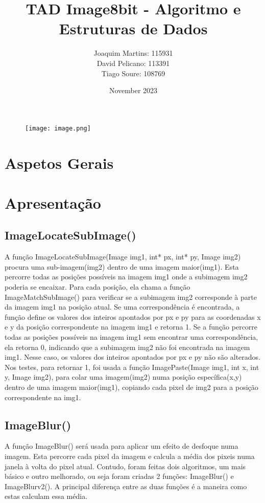 \documentclass{article}
\title{TAD Image8bit - Algoritmo e Estruturas de Dados}
\author{
  Joaquim Martins: 115931 \\
  David Pelicano: 113391 \\
  Tiago Soure: 108769
}
\date{November 2023}
\begin{document}
\maketitle

\begin{figure}[H]
  \centering
  \texttt{[image: image.png]}
\end{figure}  

\newpage
\renewcommand\contentsname{Índice}
\tableofcontents 
\newpage


\section{Aspetos Gerais}

\section{Apresentação}
\subsection{ImageLocateSubImage()}

A função ImageLocateSubImage(Image img1, int* px, int* py, Image img2) procura uma sub-imagem(img2) dentro
de uma imagem maior(img1). Esta percorre todas as posições possíveis na imagem img1 onde a subimagem img2
poderia se encaixar. 
Para cada posição, ela chama a função ImageMatchSubImage() para verificar se a subimagem img2 
corresponde à parte da imagem img1 na posição atual.
Se uma correspondência é encontrada, a função define os valores dos inteiros apontados por px e
py para as coordenadas x e y da posição correspondente na imagem img1 e retorna 1.
Se a função percorre todas as posições possíveis na imagem img1 sem encontrar uma correspondência,
ela retorna 0, indicando que a subimagem img2 não foi encontrada na imagem img1. Nesse caso, os valores
dos inteiros apontados por px e py não são alterados.
Nos testes, para retornar 1, foi usada a função ImagePaste(Image img1, int x, int y, Image img2),
para colar uma imagem(img2) numa posição específica(x,y) dentro de uma imagem maior(img1), copiando
cada pixel de img2 para a posição correspondente na img1.

\subsection{ImageBlur()}

A função ImageBlur() será usada para aplicar um efeito de desfoque numa imagem.
Esta percorre cada pixel da imagem e calcula a média dos pixeis numa janela à volta do pixel atual.
Contudo, foram feitas dois algoritmos, um mais básico e outro melhorado, ou seja foram criadas 2 funções:
ImageBlur() e ImageBlurv2(). A principal diferença entre as duas funções é a maneira como estas calculam essa média.
\end{document}
